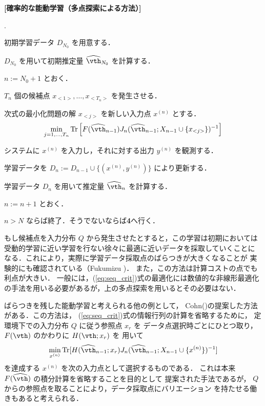 \documentclass[master]{cimt}
\newcommand{\hvth}{\widehat{{\vth}}}
\newcommand{\trace}{\text{Tr}}
\begin{document}
\medskip
\noindent
{\bf [確率的な能動学習（多点探索による方法）]}
\begin{list} 
{{\bf {}}.}{\setlength{\itemsep}{2pt}\setlength{\leftmargin}{25pt}}
\item 初期学習データ $D_{N_0}$ を用意する． 
\item $D_{N_0}$ を用いて初期推定量 $\hvth_{N_0}$ を計算する．
\item $n := N_0 + 1$ とおく．
\item $T_n$ 個の候補点 $x_{<1>}, \ldots, x_{<T_n>}$ を発生させる．
\item 
次式の最小化問題の解 $x_{<j>}$ を新しい入力点 $x^{(n)}$ とする．
\[
\min_{j=1,\ldots,T_n} 
\text{Tr} \left[ F(\hvth_{n-1})  J_n(\hvth_{n-1}; X_{n-1}\cup 
	\{ x_{<j>} \})^{-1} \right] 
\]      
\item システムに $x^{(n)}$ を入力し，それに対する出力 $y^{(n)}$ を観測する．  
\item 学習データを $D_n := D_{n-1} \cup \{(x^{(n)}, y^{(n)})\}$ 
により更新する． 
\item 学習データ $D_n$ を用いて推定量 $\hvth_n$ を計算する．
\item $n := n+1$ とおく． 
\item $n > N$ ならば終了．そうでないならば{\bf 4}へ行く． 
\end{list}
\medskip

もし候補点を入力分布 $Q$ から発生させたとすると，この学習は初期においては
受動的学習に近い学習を行ない徐々に最適に近いデータを採取していくことに
なる．これにより，実際に学習データ採取点のばらつきが大きくなることが
実験的にも確認されている（Fukumizu \cite{fuku_al_ieee})．
また，この方法は計算コストの点でも利点が大きい．
一般には，(\ref{eq:seq_crit})式の最適化には数値的な非線形最適化
の手法を用いる必要があるが，上の多点探索を用いるとその必要はない．

ばらつきを残した能動学習と考えられる他の例として，
Cohn(\cite{CohnAL})の提案した方法がある．この方法は，
(\ref{eq:seq_crit})式の情報行列の計算を省略するために，
定環境下での入力分布 $Q$ に従う参照点 $x_r$ を
データ点選択時ごとにひとつ取り，$F(\vth)$ のかわりに $H(\vth; x_r)$ を
用いて
\begin{equation*}
	\min_{x^{(n)}} 
		\trace[ H(\widehat{\vth}_{n-1}; x_r) J_n(\widehat{\vth}_{n-1}; 
		X_{n-1}\cup \{ x^{(n)} \} )^{-1} ]
\end{equation*}
を達成する $x^{(n)}$ を次の入力点として選択するものである．
これは本来 $F(\widehat{\vth})$ の積分計算を省略することを目的として
提案された手法であるが，
$Q$ からの参照点を取ることにより，データ採取点にバリエーション
を持たせる働きもあると考えられる．
\end{document}
